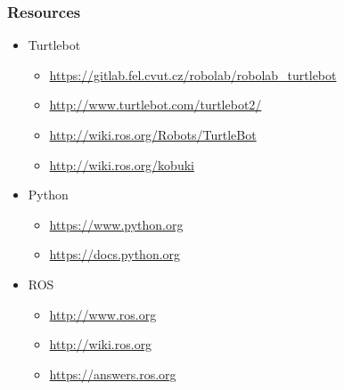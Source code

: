 \documentclass{beamer}
\begin{document}
\begin{frame}[fragile]
  \frametitle{Resources}
   \begin{itemize}
   \item Turtlebot
     \begin{itemize}
     \item \url{https://gitlab.fel.cvut.cz/robolab/robolab_turtlebot}
     \item \url{http://www.turtlebot.com/turtlebot2/}
     \item \url{http://wiki.ros.org/Robots/TurtleBot}
     \item \url{http://wiki.ros.org/kobuki}
     \end{itemize}
   \item Python
     \begin{itemize}
     \item \url{https://www.python.org}
     \item \url{https://docs.python.org}
     \end{itemize}
   \item ROS
     \begin{itemize}
     \item \url{http://www.ros.org}
     \item \url{http://wiki.ros.org}
     \item \url{https://answers.ros.org}
     \end{itemize}
   \end{itemize}
\end{frame}
\end{document}

